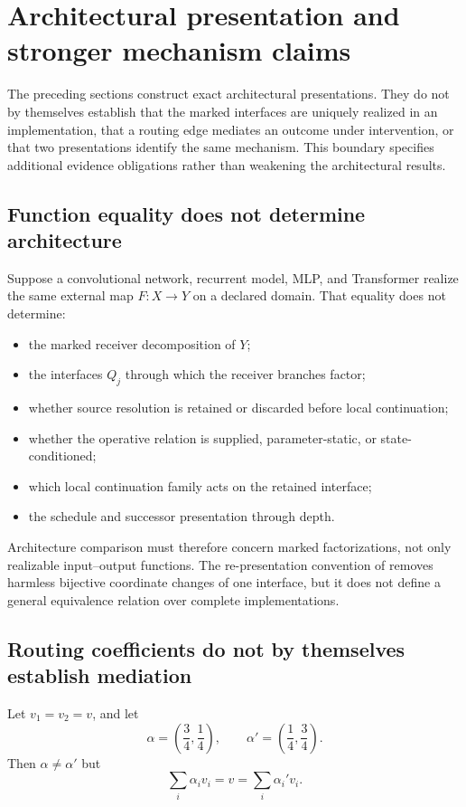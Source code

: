 \section{Architectural presentation and stronger mechanism claims}\label{sec:mechanism-boundary}

The preceding sections construct exact architectural presentations. They do not by themselves establish that the marked interfaces are uniquely realized in an implementation, that a routing edge mediates an outcome under intervention, or that two presentations identify the same mechanism. This boundary specifies additional evidence obligations rather than weakening the architectural results.

\subsection{Function equality does not determine architecture}

Suppose a convolutional network, recurrent model, MLP, and Transformer realize the same external map $F:X\to Y$ on a declared domain. That equality does not determine:
\begin{itemize}
\item the marked receiver decomposition of $Y$;
\item the interfaces $Q_j$ through which the receiver branches factor;
\item whether source resolution is retained or discarded before local continuation;
\item whether the operative relation is supplied, parameter-static, or state-conditioned;
\item which local continuation family acts on the retained interface;
\item the schedule and successor presentation through depth.
\end{itemize}
Architecture comparison must therefore concern marked factorizations, not only realizable input--output functions. The re-presentation convention of  removes harmless bijective coordinate changes of one interface, but it does not define a general equivalence relation over complete implementations.

\subsection{Routing coefficients do not by themselves establish mediation}

\begin{proposition}\label{prop:weights-not-mediation}
Let $v_1=v_2=v$, and let
\[
\alpha=\left(\frac34,\frac14\right),
\qquad
\alpha'=\left(\frac14,\frac34\right).
\]
Then $\alpha\neq\alpha'$ but
\[
\sum_i\alpha_iv_i
=
v
=
\sum_i\alpha_i'v_i.
\]
\end{proposition}

